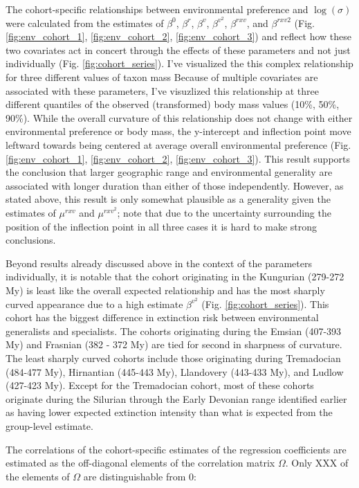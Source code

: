 \documentclass{article}
\begin{document}
The cohort-specific relationships between environmental preference and \(\log(\sigma)\) were calculated from the estimates of \(\beta^{0}\), \(\beta^{r}\), \(\beta^{v}\), \(\beta^{v^{2}}\), \(\beta^{rxv}\), and \(\beta^{rxv2}\) (Fig. \ref{fig:env_cohort_1}, \ref{fig:env_cohort_2}, \ref{fig:env_cohort_3}) and reflect how these two covariates act in concert through the effects of these parameters and not just individually (Fig. \ref{fig:cohort_series}). I've visualized the this complex relationship for three different values of taxon mass
Because of multiple covariates are associated with these parameters, I've visuzlized this relationship at three different quantiles of the observed (transformed) body mass values (10\%, 50\%, 90\%). While the overall curvature of this relationship does not change with either environmental preference or body mass, the y-intercept and inflection point move leftward towards being centered at average overall environmental preference (Fig. \ref{fig:env_cohort_1}, \ref{fig:env_cohort_2}, \ref{fig:env_cohort_3}). This result supports the conclusion that larger geographic range and environmental generality are associated with longer duration than either of those independently. However, as stated above, this result is only somewhat plausible as a generality given the estimates of \(\mu^{rxv}\) and \(\mu^{rxv^2}\); note that due to the uncertainty surrounding the position of the inflection point in all three cases it is hard to make strong conclusions.


Beyond results already discussed above in the context of the parameters individually, it is notable that the cohort originating in the Kungurian (279-272 My) is least like the overall expected relationship and has the most sharply curved appearance due to a high estimate \(\beta^{v^{2}}\) (Fig. \ref{fig:cohort_series}). This cohort has the biggest difference in extinction risk between environmental generalists and specialists. The cohorts originating during the Emsian (407-393 My) and Frasnian (382 - 372 My) are tied for second in sharpness of curvature. The least sharply curved cohorts include those originating during Tremadocian (484-477 My), Hirnantian (445-443 My), Llandovery (443-433 My), and Ludlow (427-423 My). Except for the Tremadocian cohort, most of these cohorts originate during the Silurian through the Early Devonian range identified earlier as having lower expected extinction intensity than what is expected from the group-level estimate.



The correlations of the cohort-specific estimates of the regression coefficients are estimated as the off-diagonal elements of the correlation matrix \(\Omega\). Only XXX of the elements of \(\Omega\) are distinguishable from 0: 
\end{document}
